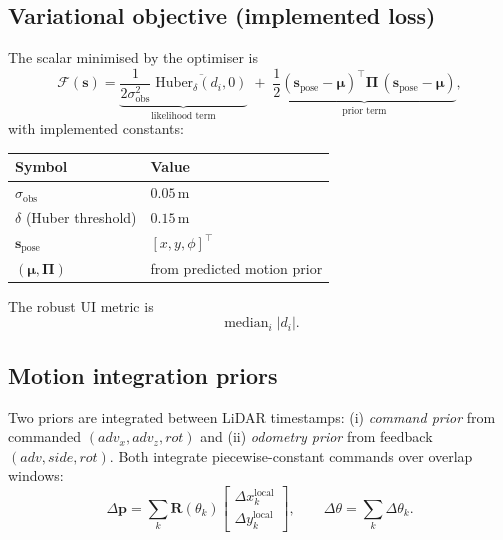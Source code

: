 \documentclass[a4paper, 11pt]{article}
\newcommand{\vect}[1]{\bm{#1}}
\newcommand{\mat}[1]{\bm{#1}}
\begin{document}
\subsection{Variational objective (implemented loss)}

The scalar minimised by the optimiser is
\begin{equation}\label{eq:free-energy}
  \mathcal{F}(\vect{s})
  = \underbrace{
      \frac{1}{2\sigma_{\text{obs}}^2}\;
      \overline{\mathrm{Huber}_\delta(d_i, 0)}
    }_{\text{likelihood term}}
  \;+\;
  \underbrace{
      \frac{1}{2}
      (\vect{s}_{\text{pose}} - \vect{\mu})^\top
      \mat{\Pi}\,
      (\vect{s}_{\text{pose}} - \vect{\mu})
    }_{\text{prior term}},
\end{equation}
with implemented constants:
\begin{center}
\begin{tabular}{ll}
  \toprule
  Symbol & Value \\
  \midrule
  $\sigma_{\text{obs}}$ & $0.05\,$m \\
  $\delta$ (Huber threshold) & $0.15\,$m \\
  $\vect{s}_{\text{pose}}$ & $[x, y, \phi]^\top$ \\
  $(\vect{\mu}, \mat{\Pi})$ & from predicted motion prior \\
  \bottomrule
\end{tabular}
\end{center}

The robust UI metric is
\begin{equation}
  \operatorname{median}_i |d_i|.
\end{equation}

\subsection{Motion integration priors}

Two priors are integrated between LiDAR timestamps:
(i) \emph{command prior} from commanded $(adv_x, adv_z, rot)$ and
(ii) \emph{odometry prior} from feedback $(adv, side, rot)$.
Both integrate piecewise-constant commands over overlap windows:
\begin{equation}\label{eq:motion-int}
  \Delta\vect{p}
  = \sum_k \mat{R}(\theta_k)
    \begin{bmatrix} \Delta x_k^{\text{local}} \\ \Delta y_k^{\text{local}} \end{bmatrix},
  \qquad
  \Delta\theta = \sum_k \Delta\theta_k.
\end{equation}
\end{document}

